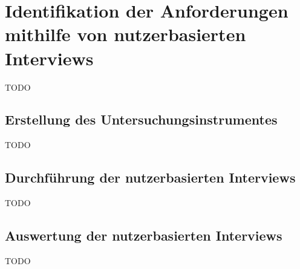 \section{Identifikation der Anforderungen mithilfe von nutzerbasierten Interviews}
TODO

\subsection{Erstellung des Untersuchungsinstrumentes}
TODO

\subsection{Durchführung der nutzerbasierten Interviews}
TODO

\subsection{Auswertung der nutzerbasierten Interviews}
TODO
